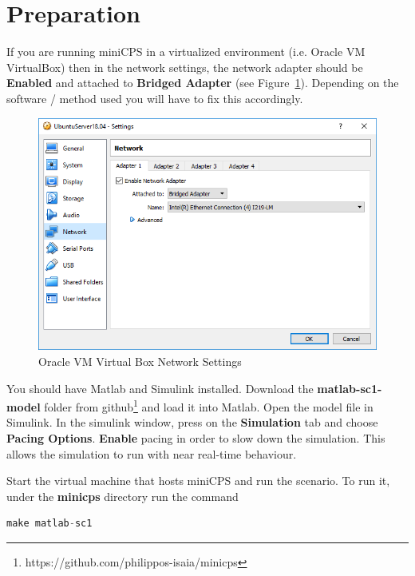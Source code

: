 \documentclass[book,a4paper,12pt,oneside]{memoir}
\begin{document}
\section{Preparation}
\label{cha:basicuse-sec:prepare}

If you are running miniCPS in a virtualized environment (i.e. Oracle VM VirtualBox) then in the network settings, the network adapter should be \textbf{Enabled} and attached to \textbf{Bridged Adapter} (see Figure~\ref{fig:OracleVMSettings}).  Depending on the software / method used you will have to fix this accordingly.   

\begin{figure}[h!]
	\centering
	\includegraphics[scale=0.8]{VirtualBoxNetworkSettings}
	\caption{Oracle VM Virtual Box Network Settings}
	\label{fig:OracleVMSettings}
\end{figure}

You should have Matlab and Simulink installed.  Download the \textbf{matlab-sc1-model} folder from github\footnote{https://github.com/philippos-isaia/minicps} and load it into Matlab.  Open the model file in Simulink.  In the simulink window, press on the \textbf{Simulation} tab and choose \textbf{Pacing Options}.  \textbf{Enable} pacing in order to slow down the simulation.  This allows the simulation to run with near real-time behaviour.

Start the virtual machine that hosts miniCPS and run the scenario.  To run it, under the \textbf{minicps} directory run the command

\begin{lstlisting}[backgroundcolor = \color{ultralightgray}, language = Python, xleftmargin = 0.1cm, framexleftmargin = 0.3em, showstringspaces=false]
make matlab-sc1
\end{lstlisting}
\end{document}
